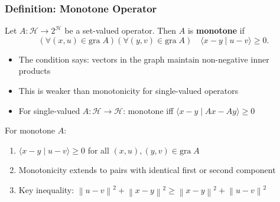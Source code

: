 \documentclass[aspectratio=169,10pt]{beamer}
\newcommand{\gra}{\mathrm{gra}\;}
\newcommand{\inprod}[2]{\langle #1 \mid #2 \rangle}
\newcommand{\norm}[1]{\left\|#1\right\|}
\newcommand{\Hilbert}{\mathcal{H}}
\begin{document}
\begin{frame}
    \frametitle{Definition: Monotone Operator}

    \begin{definition}[Definition 20.1]
        Let $A : \Hilbert \to 2^{\Hilbert}$ be a set-valued operator. Then $A$ is \textbf{monotone} if
        \[
            (\forall (x,u) \in \gra A)(\forall (y,v) \in \gra A) \quad
            \inprod{x - y}{u - v} \geq 0.
        \]
    \end{definition}

    \vspace{1em}

    \begin{itemize}
        \item The condition says: vectors in the graph maintain non-negative inner products
        \item This is weaker than monotonicity for single-valued operators
        \item For single-valued $A : \Hilbert \to \Hilbert$: monotone iff $\inprod{x-y}{Ax-Ay} \geq 0$
    \end{itemize}

    \vspace{1.5em}

    \begin{example}
        For monotone $A$:
        \begin{enumerate}
            \item[(i)] $\inprod{x - y}{u - v} \geq 0$ for all $(x,u), (y,v) \in \gra A$
            \item[(ii)] Monotonicity extends to pairs with identical first or second component
            \item[(iii)] Key inequality: $\norm{u - v}^2 + \norm{x - y}^2 \geq \norm{x - y}^2 + \norm{u - v}^2$
        \end{enumerate}
    \end{example}
\end{frame}
\end{document}
